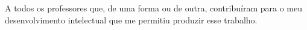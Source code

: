 A todos os professores que, de uma forma ou de outra, contribuíram para o meu desenvolvimento intelectual
que me permitiu produzir esse trabalho.


